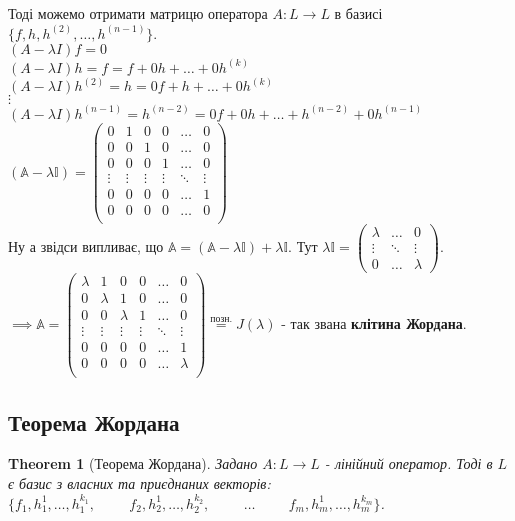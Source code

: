 \documentclass[a4paper, 10pt]{article}
\theoremstyle{theoremdd}
\newtheorem{theorem}{Theorem}[subsection]
\begin{document}
Тоді можемо отримати матрицю оператора $A: L \to L$ в базисі $\{f,h,h^{(2)},\dots,h^{(n-1)}\}$.\\
$(A-\lambda I)f = 0$\\
$(A-\lambda I)h = f = f + 0h + \dots + 0h^{(k)}$\\
$(A-\lambda I)h^{(2)} = h = 0f + h + \dots + 0h^{(k)}$\\
$\vdots$\\
$(A-\lambda I)h^{(n-1)} = h^{(n-2)} = 0f + 0h + \dots + h^{(n-2)} + 0h^{(n-1)}$\\
$(\mathbb{A}- \lambda \mathbb{I}) = \begin{pmatrix}
0 & 1 & 0 & 0 & \dots & 0 \\
0 & 0 & 1 & 0 & \dots & 0 \\
0 & 0 & 0 & 1 & \dots & 0 \\
\vdots & \vdots & \vdots & \vdots & \ddots & \vdots \\
0 & 0 & 0 & 0 & \dots & 1 \\
0 & 0 & 0 & 0 & \dots & 0 \\
\end{pmatrix}$\\
Ну а звідси випливає, що $\mathbb{A} = (\mathbb{A} - \lambda \mathbb{I}) + \lambda \mathbb{I}$. Тут $\lambda \mathbb{I} = \begin{pmatrix}
\lambda & \dots & 0\\
\vdots & \ddots & \vdots\\
0 & \dots & \lambda
\end{pmatrix}$.\\
$\implies \mathbb{A} = \begin{pmatrix}
\lambda & 1 & 0 & 0 & \dots & 0 \\
0 & \lambda & 1 & 0 & \dots & 0 \\
0 & 0 & \lambda & 1 & \dots & 0 \\
\vdots & \vdots & \vdots & \vdots & \ddots & \vdots \\
0 & 0 & 0 & 0 & \dots & 1 \\
0 & 0 & 0 & 0 & \dots & \lambda \\
\end{pmatrix} \overset{\textrm{позн.}}{=} J(\lambda)$ - так звана \textbf{клітина Жордана}.

\subsection{Теорема Жордана}
\begin{theorem}[Теорема Жордана]
Задано $A: L \to L$ - лінійний оператор. Тоді в $L$ є базис з власних та приєднаних векторів:\\
$\{f_1, h_1^1, \dots ,h_1^{k_1}, \hspace{1cm} f_2, h_2^1, \dots, h_2^{k_2}, \hspace{1cm} \dots \hspace{1cm} f_m, h_m^{1}, \dots, h_m^{k_m}\}$.
\end{theorem}
\end{document}
